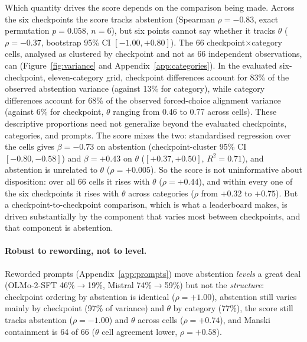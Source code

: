 Which quantity drives the score depends on the comparison being made. Across
the six checkpoints the score tracks abstention (Spearman $\rho=-0.83$,
exact permutation $p=0.058$, $n=6$), but six points cannot say whether it tracks $\theta$
($\rho=-0.37$, bootstrap 95\% CI $[-1.00,+0.80]$). The 66
checkpoint$\times$category cells, analysed as clustered by checkpoint and not as
66 independent observations, can (Figure~\ref{fig:variance} and
Appendix~\ref{app:categories}). In the evaluated six-checkpoint, eleven-category grid, checkpoint
differences account for 83\% of the observed abstention variance (against
13\% for category), while category differences account for 68\% of the
observed forced-choice alignment variance (against 6\% for checkpoint,
$\theta$ ranging from 0.46 to 0.77 across cells). These descriptive
proportions need not generalize beyond the evaluated checkpoints, categories,
and prompts. The score mixes the
two: standardised regression over the cells gives $\beta=-0.73$ on abstention
(checkpoint-cluster 95\% CI $[-0.80,-0.58]$) and $\beta=+0.43$ on $\theta$
($[+0.37,+0.50]$, $R^2=0.71$), and abstention is unrelated to $\theta$
($\rho=+0.005$). So the score is not uninformative about disposition: over all 66
cells it rises with $\theta$ ($\rho=+0.44$), and within
every one of the six checkpoints it rises with $\theta$ across categories
($\rho$ from $+0.32$ to $+0.75$). But a checkpoint-to-checkpoint comparison,
which is what a leaderboard makes, is driven substantially by the component
that varies most between checkpoints, and that component is abstention.

\paragraph{Robust to rewording, not to level.} Reworded prompts
(Appendix~\ref{app:prompts}) move abstention \emph{levels} a great deal
(OLMo-2-SFT 46\%$\to$19\%, Mistral 74\%$\to$59\%) but not the
\emph{structure}: checkpoint ordering by abstention is identical
($\rho=+1.00$), abstention still varies mainly by checkpoint (97\% of
variance) and $\theta$ by category (77\%), the score still tracks
abstention ($\rho=-1.00$) and $\theta$ across cells ($\rho=+0.74$), and
Manski containment is 64 of 66 ($\theta$ cell agreement lower, $\rho=+0.58$).

